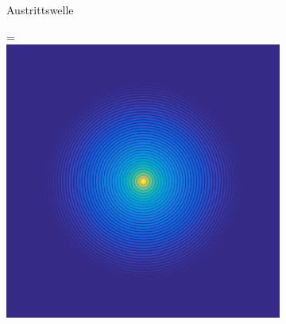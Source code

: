 \begin{figure}
\begin{subfigure}[b]{0.49\textwidth}
		\caption{Austrittswelle}
		\label{fig:exitwave}
	\end{subfigure}
	\begin{subfigure}[b]{0.49\textwidth}
		 =\hbox{\includegraphics[width=\textwidth]{images/fig_sim_scatter_multislice-r100-bd1e-3.png}}

\end{subfigure}
\end{figure}
